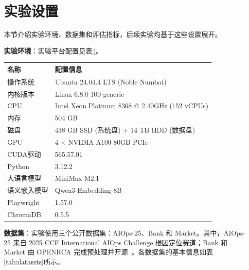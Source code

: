 \section{实验设置}

本节介绍实验环境、数据集和评估指标，后续实验均基于这些设置展开。

\textbf{实验环境}：实验平台配置见表\ref{tab:experiment_config}。

\begin{table}[htbp]
    \centering
    \label{tab:experiment_config}
    \ChapFiveTableSetup
    \begin{tabular}{ll}
        \toprule
        \rowcolor{\ChapFiveTableHeadColor}
        \textbf{名称} & \textbf{配置信息} \\
        \midrule
        操作系统 & Ubuntu 24.04.4 LTS (Noble Numbat) \\
        内核版本 & Linux 6.8.0-100-generic \\
        CPU & Intel Xeon Platinum 8368 @ 2.40GHz (152 vCPUs) \\
        内存 & 504 GB \\
        磁盘 & 438 GB SSD (系统盘) + 14 TB HDD (数据盘) \\
        GPU & 4 × NVIDIA A100 80GB PCIe \\
        CUDA驱动 & 565.57.01 \\
        Python & 3.12.2 \\
        大语言模型 & MiniMax M2.1~\cite{minimax2025} \\
        语义嵌入模型 & Qwen3-Embedding-8B~\cite{qwen3embedding2025} \\
        Playwright~\cite{playwright2026} & 1.57.0 \\
        ChromaDB~\cite{chromadb2026} & 0.5.5 \\
        \bottomrule
    \end{tabular}
\end{table}

\textbf{数据集}：实验使用三个公开数据集：AIOps-25、Bank 和 Market。其中，AIOps-25 来自 2025 CCF International AIOps Challenge 根因定位赛道\cite{aiops2025challenge}；Bank 和 Market 由 OPENRCA 完成预处理并开源~\cite{xu2025openrca}。各数据集的基本信息如表\ref{tab:datasets}所示。

